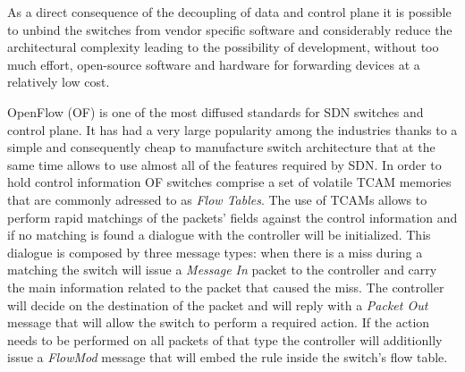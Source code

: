 As a direct consequence of the decoupling of data and control plane it is possible to unbind the switches from vendor specific software and considerably reduce the architectural complexity leading to the possibility of development, without too much effort, open-source software and hardware for forwarding devices at a relatively low cost. 

OpenFlow (OF) \cite{mckeown2008openflow} is one of the most diffused standards for SDN switches and control plane. It has had a very large popularity among the industries thanks to a simple and consequently cheap to manufacture switch architecture that at the same time allows to use almost all of the features required by SDN. In order to hold control information OF switches comprise a set of volatile TCAM memories that are commonly adressed to as \textit{Flow Tables}. The use of TCAMs allows to perform rapid matchings of the packets' fields against the control information and if no matching is found a dialogue with the controller will be initialized. This dialogue is composed by three message types: when there is a miss during a matching the switch will issue a \textit{Message In} packet to the controller and carry the main information related to the packet that caused the miss. The controller will decide on the destination of the packet and will reply with a \textit{Packet Out} message that will allow the switch to perform a required action. If the action needs to be performed on all packets of that type the controller will additionlly issue a \textit{FlowMod} message that will embed the rule inside the switch's flow table.


